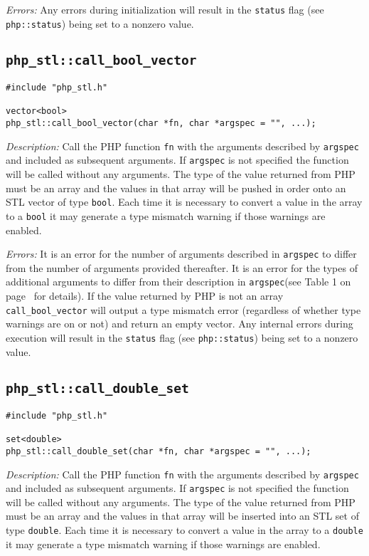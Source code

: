 \documentclass[11pt,titlepage]{article}
\begin{document}
\emph{Errors:} Any errors during initialization will result in the \verb|status| flag (see \verb|php::status|) being set to a nonzero value.


\subsection{\texttt{php\_stl::call\_bool\_vector}}

\begin{verbatim}
#include "php_stl.h"

vector<bool> 
php_stl::call_bool_vector(char *fn, char *argspec = "", ...);
\end{verbatim}

\emph{Description:} Call the PHP function \verb|fn| with the arguments described by \verb|argspec| and included as subsequent arguments. If \verb|argspec| is not specified the function will be called without any arguments. The type of the value returned from PHP must be an array and the values in that array will be pushed in order onto an STL vector of type \verb|bool|. Each time it is necessary to convert a value in the array to a \verb|bool| it may generate a type mismatch warning if those warnings are enabled.

\emph{Errors:} It is an error for the number of arguments described in \verb|argspec| to differ from the number of arguments provided thereafter. It is an error for the types of additional arguments to differ from their description in \verb|argspec|(see Table 1 on page~\pageref{Table1} for details). If the value returned by PHP is not an array \verb|call_bool_vector| will output a type mismatch error (regardless of whether type warnings are on or not) and return an empty vector. Any internal errors during execution will result in the \verb|status| flag (see \verb|php::status|) being set to a nonzero value.


\subsection{\texttt{php\_stl::call\_double\_set}}

\begin{verbatim}
#include "php_stl.h"

set<double> 
php_stl::call_double_set(char *fn, char *argspec = "", ...);
\end{verbatim}

\emph{Description:} Call the PHP function \verb|fn| with the arguments described by \verb|argspec| and included as subsequent arguments. If \verb|argspec| is not specified the function will be called without any arguments. The type of the value returned from PHP must be an array and the values in that array will be inserted into an STL set of type \verb|double|. Each time it is necessary to convert a value in the array to a \verb|double| it may generate a type mismatch warning if those warnings are enabled.
\end{document}
